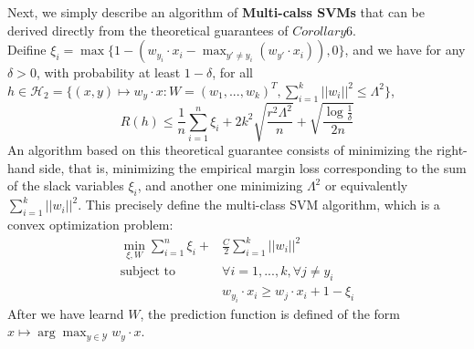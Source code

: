 Next, we simply describe an algorithm of \textbf{Multi-calss SVMs} that can be derived directly from the theoretical guarantees of $Corollary6$.\\
Deifine $\xi_i = \max\{1-(w_{y_i}\cdot x_i-\max_{y'\ne y_i}(w_{y'}\cdot x_i)), 0\}$, and we have for any $\delta>0$, with probability at least $1-\delta$, for all $h\in \mathcal{H}_2 = \{(x,y) \mapsto w_y \cdot x : W = (w_1,...,w_k)^T, \sum_{i=1}^{k}||w_i||^2 \leq \Lambda^2 \}$,
\begin{equation}
R(h) \leq \frac{1}{n}\sum_{i=1}^{n}\xi_i + 2k^2\sqrt{\frac{r^2\Lambda^2}{n}} + \sqrt{\frac{\log\frac{1}{\delta}}{2n}}
\end{equation}
An algorithm based on this theoretical guarantee consists of minimizing the right-hand side, that is, minimizing the empirical margin loss corresponding to the sum of the slack variables $\xi_i$, and another one minimizing $\Lambda^2$ or equivalently $\sum_{i=1}^{k}||w_i||^2$. This precisely define the multi-class SVM algorithm, which is a convex optimization problem:
\begin{align}
\min_{\xi, W} \sum_{i=1}^{n}\xi_i +& \frac{C}{2}\sum_{i=1}^{k}||w_i||^2\\
\text{subject to}\quad & \forall i=1,...,k , \forall j\ne y_i \\
&w_{y_i}\cdot x_i \geq w_j\cdot x_i +1-\xi_i
\end{align}
After we have learnd $W$, the prediction function is defined of the form $x \mapsto \arg\max_{y\in\mathcal{Y}} w_y \cdot x$.
